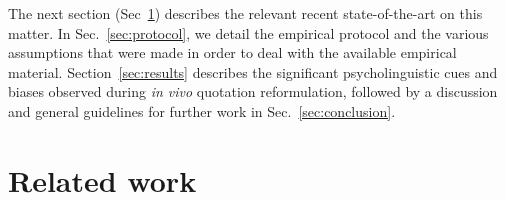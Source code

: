 \label{subsec:problematique}


The next section (Sec~\ref{sec:related}) describes the relevant recent state-of-the-art on this matter. In Sec.~\ref{sec:protocol}, we detail the empirical protocol and the various assumptions that were made in order to deal with the available empirical material. Section~\ref{sec:results} describes the significant psycholinguistic cues and biases observed during \emph{in vivo} quotation reformulation, followed by a discussion and general guidelines for further work in Sec.~\ref{sec:conclusion}.

\section{Related work}\label{sec:related}

